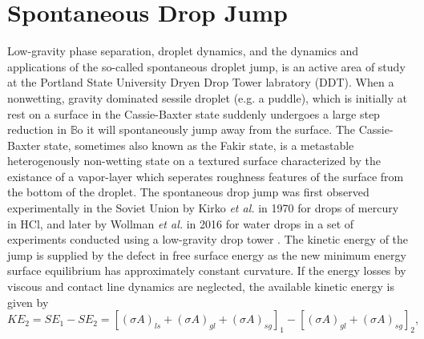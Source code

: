 \documentclass[12pt,a4paper,oneside]{book}
\begin{document}
\section{Spontaneous Drop Jump}
Low-gravity phase separation, droplet dynamics, and the dynamics and applications of the so-called spontaneous droplet jump, is an active area of study at the Portland State University Dryen Drop Tower labratory (DDT). When a nonwetting, gravity dominated sessile droplet (e.g. a puddle), which is initially at rest on a surface in the Cassie-Baxter state suddenly undergoes a large step reduction in $\mathbb{B}\mbox{o}$ it will spontaneously jump away from the surface. The Cassie-Baxter state, sometimes also known as the Fakir state, is a metastable heterogenously non-wetting state on a textured surface characterized by the existance of a vapor-layer which seperates roughness features of the surface from the bottom of the droplet. The spontaneous drop jump was first observed experimentally in the Soviet Union by Kirko \emph{et al.} \cite{kirko_phenomenon_1970} in 1970 for drops of mercury in HCl, and later by Wollman \emph{et al.} in 2016 for water drops in a set of experiments conducted using a low-gravity drop tower \cite{wollman_more_2016}. The kinetic energy of the jump is supplied by the defect in free surface energy as the new minimum energy surface equilibrium has approximately constant curvature. If the energy losses by viscous and contact line dynamics are neglected, the available kinetic energy is given by
\[KE_2 = SE_1 - SE_2= [(\sigma A)_{ls} + (\sigma A)_{gl} + (\sigma A)_{sg}]_1 - [(\sigma A)_{gl} + (\sigma A)_{sg}]_2, \]
\end{document}
